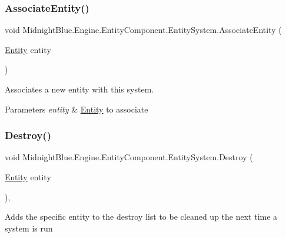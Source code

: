 \subsubsection{\texorpdfstring{Associate\+Entity()}{AssociateEntity()}}
{\footnotesize\ttfamily void Midnight\+Blue.\+Engine.\+Entity\+Component.\+Entity\+System.\+Associate\+Entity (\begin{DoxyParamCaption}\item[{\hyperlink{class_midnight_blue_1_1_engine_1_1_entity_component_1_1_entity}{Entity}}]{entity }\end{DoxyParamCaption})\hspace{0.3cm}{\ttfamily [inline]}}



Associates a new entity with this system. 


\begin{DoxyParams}{Parameters}
{\em entity} & \hyperlink{class_midnight_blue_1_1_engine_1_1_entity_component_1_1_entity}{Entity} to associate\\
\hline
\end{DoxyParams}
\hypertarget{class_midnight_blue_1_1_engine_1_1_entity_component_1_1_entity_system_ad81e1336d9fa1ae5bdbedce1dfa5db2b}{}\label{class_midnight_blue_1_1_engine_1_1_entity_component_1_1_entity_system_ad81e1336d9fa1ae5bdbedce1dfa5db2b} 
\subsubsection{\texorpdfstring{Destroy()}{Destroy()}}
{\footnotesize\ttfamily void Midnight\+Blue.\+Engine.\+Entity\+Component.\+Entity\+System.\+Destroy (\begin{DoxyParamCaption}\item[{\hyperlink{class_midnight_blue_1_1_engine_1_1_entity_component_1_1_entity}{Entity}}]{entity }\end{DoxyParamCaption})\hspace{0.3cm}{\ttfamily [inline]}, {\ttfamily [protected]}}



Adds the specific entity to the destroy list to be cleaned up the next time a system is run 


